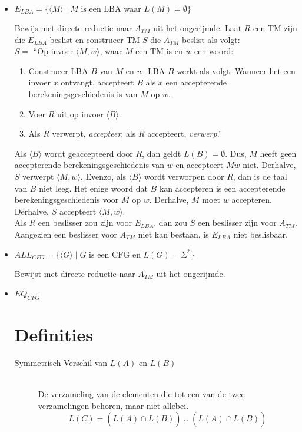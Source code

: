 \documentclass[]{article}
\begin{document}
\begin{itemize}
	
	\item $E_{LBA} = \{ \langle M \rangle \mid M \mbox{ is een LBA waar } L(M) = \emptyset \}$
	
	Bewijs met directe reductie naar $A_{TM}$ uit het ongerijmde.
	Laat $R$ een TM zijn die $E_{LBA}$ beslist en construeer TM $S$ die $A_{TM}$ beslist als volgt: \\	
	$S = $ ``Op invoer $\langle M, w \rangle$, waar $M$ een TM is en $w$ een woord:
	\begin{enumerate}
		\item Construeer LBA $B$ van $M$ en $w$. LBA $B$ werkt als volgt. Wanneer het een invoer $x$ ontvangt, accepteert $B$ als $x$ een accepterende berekeningsgeschiedenis is van $M$ op $w$.
		\item Voer $R$ uit op invoer $\langle B \rangle$.
		\item Als $R$ verwerpt, \emph{accepteer}; als $R$ accepteert, \emph{verwerp}.''
	\end{enumerate}
	Als $\langle B \rangle$ wordt geaccepteerd door $R$, dan geldt $L(B) = \emptyset$. Dus, $M$ heeft geen accepterende berekeningsgeschiedenis van $w$ en accepteert $M w$ niet. Derhalve, $S$ verwerpt $\langle M, w \rangle$. Evenzo, als $\langle B \rangle$ wordt verworpen door $R$, dan is de taal van $B$ niet leeg. Het enige woord dat $B$ kan accepteren is een accepterende berekeningsgeschiedenis voor $M$ op $w$. Derhalve, $M$ moet $w$ accepteren. Derhalve, $S$ accepteert $\langle M, w \rangle$. \\
	Als $R$ een beslisser zou zijn voor $E_{LBA}$, dan zou $S$ een beslisser zijn voor $A_{TM}$. Aangezien een beslisser voor $A_{TM}$ niet kan bestaan, is $E_{LBA}$ niet beslisbaar.
	
	
	\item $ALL_{CFG} = \{ \langle G \rangle \mid G \mbox{ is een CFG en } L(G) = \Sigma^* \}$
	
	Bewijst met directe reductie naar $A_{TM}$ uit het ongerijmde.
	
	
	\item $EQ_{CFG}$
		
\section*{Definities}
\begin{description}
	\item[Symmetrisch Verschil van $L(A)$ en $L(B)$] \hfill \\
	De verzameling van de elementen die tot een van de twee verzamelingen behoren, maar niet allebei.
	$$L(C) = \left( L(A) \cap \overline{L(B)} \right) \cup \left( \overline{L(A)} \cap L(B) \right)$$
	

\end{description}
\end{itemize}
\end{document}
